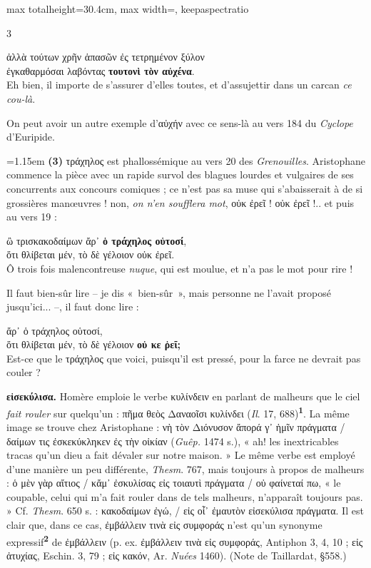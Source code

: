 \documentclass[11pt,twoside]{book}
\newcommand{\italique}[1]{\textit{#1}}
\newcommand{\citComm}[1]{\begin{quoting}[vskip=0.4pt,leftmargin=0.7em,rightmargin=0.2em]#1\end{quoting}}
\newcommand{\marqueur}[1]{\textsuperscript{\color{rubricRed}\textbf{#1}}}
\begin{document}
\begin{adjustbox}{max totalheight=30.4cm, max width=\textwidth, keepaspectratio}
\begin{minipage}{\textwidth}
{\begin{multicols}{3}
\citComm{ἀλλὰ τούτων χρῆν ἁπασῶν ἐς τετρημένον ξύλον\\
ἐγκαθαρμόσαι λαβόντας \textbf{τουτονὶ τὸν αὐχένα}.\\
Eh bien, il importe de s'assurer d'elles toutes, et d'assujettir dans un carcan \italique{ce cou-là}.}
\par\vspace{1.5pt}
\noindent On peut avoir un autre exemple d'αὐχήν avec ce sens-là au vers 184 du \italique{Cyclope} d'Euripide.
\par\vspace{1.5pt}
\noindent\hangindent=1.15em {\color{sepiaNote}\textbf{(3)}} τράχηλος est phallossémique au vers 20 des \italique{Grenouilles}. Aristophane commence la pièce avec un rapide survol des blagues lourdes et vulgaires de ses concurrents aux concours comiques ; ce n'est pas sa muse qui s'abaisserait à de si grossières manœuvres ! non, \italique{on n'en soufflera mot}, οὐκ ἐρεῖ ! οὐκ ἐρεῖ !.. et puis au vers 19 :
\citComm{ὢ τρισκακοδαίμων ἄρ᾽ \textbf{ὁ τράχηλος οὑτοσί},\\
ὅτι θλίβεται μέν, τὸ δὲ γέλοιον οὐκ ἐρεῖ.\\
Ô trois fois malencontreuse \italique{nuque}, qui est moulue, et n'a pas le mot pour rire !}
\par\vspace{1.5pt}
\noindent Il faut bien-sûr lire -- je dis «~bien-sûr~», mais personne ne l'avait proposé jusqu'ici... --, il faut donc lire :
\citComm{ἄρ᾽ ὁ τράχηλος οὑτοσί,\\
ὅτι θλίβεται μέν, τὸ δὲ γέλοιον \textbf{οὐ κε ῥεῖ;}\\
Est-ce que le τράχηλος que voici, puisqu'il est pressé, pour la farce ne devrait pas couler ?}
\par\vspace{1.5pt}
 \textbf{εἰσεκύλισα.} Homère emploie le verbe κυλίνδειν en parlant de malheurs que le ciel \italique{fait rouler} sur quelqu'un : πῆμα θεὸς Δαναοῖσι κυλίνδει (\italique{Il}. 17, 688)\marqueur{1}. La même image se trouve chez Aristophane : νὴ τὸν Διόνυσον ἄπορά γ᾽ ἡμῖν πράγματα / δαίμων τις ἐσκεκύκληκεν ἐς τὴν οἰκίαν (\italique{Guêp.} 1474 s.), « ah! les inextricables tracas qu'un dieu a fait dévaler sur notre maison. » Le même verbe est employé d'une manière un peu différente, \italique{Thesm}. 767, mais toujours à propos de malheurs : ὁ μὲν γὰρ αἴτιος / κἄμ᾽ ἐσκυλίσας εἰς τοιαυτὶ πράγματα / οὐ φαίνεταί πω, « le coupable, celui qui m'a fait rouler dans de tels malheurs, n'apparaît toujours pas. » Cf. \italique{Thesm}. 650 s. : κακοδαίμων ἐγώ, / εἰς οἷ᾽ ἐμαυτὸν εἰσεκύλισα πράγματα. Il est clair que, dans ce cas, ἐμβάλλειν τινὰ εἰς συμφοράς n'est qu'un synonyme expressif\marqueur{2} de ἐμβάλλειν (p. ex. ἐμβάλλειν τινὰ εἰς συμφοράς, Antiphon 3, 4, 10 ; εἰς ἀτυχίας, Eschin. 3, 79 ; εἰς κακόν, Ar. \italique{Nuées} 1460). (Note de Taillardat, §558.)

\end{multicols}}
\end{minipage}
\end{adjustbox}
\end{document}
